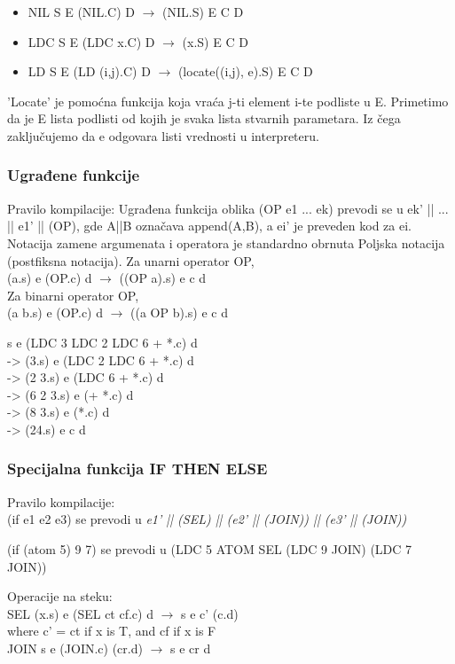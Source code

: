 \begin{primer}
\begin{itemize}
\item NIL S E (NIL.C) D $\rightarrow$ (NIL.S) E C D\\
\item LDC S E (LDC x.C) D $\rightarrow$ (x.S) E C D\\
\item LD S E (LD (i,j).C) D $\rightarrow$ (locate((i,j), e).S) E C D\\
\end{itemize}
\end{primer}
'Locate' je pomoćna funkcija koja vraća j-ti element i-te podliste u E. Primetimo da je E lista podlisti od kojih je svaka lista stvarnih parametara. Iz čega zaključujemo da e odgovara listi vrednosti u interpreteru.

\subsubsection{Ugrađene funkcije}
Pravilo kompilacije: Ugrađena funkcija oblika (OP e1 ... ek) prevodi se u ek' || ... || e1' || (OP), gde A||B označava append(A,B), a ei' je preveden kod za ei. Notacija zamene argumenata i operatora je standardno obrnuta Poljska notacija (postfiksna notacija).
Za unarni operator OP,\\
(a.s) e (OP.c) d $\rightarrow$ ((OP a).s) e c d\\
Za binarni operator OP,\\
(a b.s) e (OP.c) d $\rightarrow$ ((a OP b).s) e c d
\begin{primer}
s e (LDC 3 LDC 2 LDC 6 + *.c) d\\
-> (3.s) e (LDC 2 LDC 6 + *.c) d\\
-> (2 3.s) e (LDC 6 + *.c) d\\
-> (6 2 3.s) e (+ *.c) d\\
-> (8 3.s) e (*.c) d\\
-> (24.s) e c d\\
\end{primer}
\subsubsection{Specijalna funkcija IF THEN ELSE}
Pravilo kompilacije:\\
(if e1 e2 e3) se prevodi u {\em e1' || (SEL) || (e2' || (JOIN)) || (e3' || (JOIN))}\\
\begin{primer}
(if (atom 5) 9 7) se prevodi u (LDC 5 ATOM SEL (LDC 9 JOIN) (LDC 7 JOIN))\\
\end{primer}
Operacije na steku:\\
SEL (x.s) e (SEL ct cf.c) d $\rightarrow$ s e c' (c.d)\\
where c' = ct if x is T, and cf if x is F\\
JOIN s e (JOIN.c) (cr.d) $\rightarrow$ s e cr d\\

